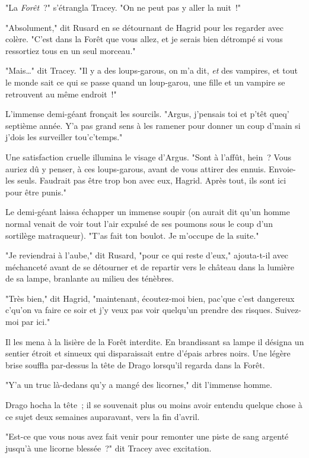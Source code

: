 "La \emph{Forêt}~?" s'étrangla Tracey. "On ne peut pas y aller la nuit~!"

"Absolument," dit Rusard en se détournant de Hagrid pour les regarder avec colère. "C'est dans la Forêt que vous allez, et je serais bien détrompé si vous ressortiez tous en un seul morceau."

"Mais…" dit Tracey. "Il y a des loups-garous, on m'a dit, \emph{et} des vampires, et tout le monde sait ce qui se passe quand un loup-garou, une fille et un vampire se retrouvent au même endroit~!"

L'immense demi-géant fronçait les sourcils. "Argus, j'pensais toi et p'têt queq' septième année. Y'a pas grand sens à les ramener pour donner un coup d'main si j'dois les surveiller tou'c'temps."

Une satisfaction cruelle illumina le visage d'Argus. "Sont à l'affût, hein~? Vous auriez dû y penser, à ces loups-garous, avant de vous attirer des ennuis. Envoie-les seuls. Faudrait pas être trop bon avec eux, Hagrid. Après tout, ils sont ici pour être punis."

Le demi-géant laissa échapper un immense soupir (on aurait dit qu'un homme normal venait de voir tout l'air expulsé de ses poumons sous le coup d'un sortilège matraqueur). "T'as fait ton boulot. Je m'occupe de la suite."

"Je reviendrai à l'aube," dit Rusard, "pour ce qui reste d'eux," ajouta-t-il avec méchanceté avant de se détourner et de repartir vers le château dans la lumière de sa lampe, branlante au milieu des ténèbres.

"Très bien," dit Hagrid, "maintenant, écoutez-moi bien, pac'que c'est dangereux c'qu'on va faire ce soir et j'y veux pas voir quelqu'un prendre des risques. Suivez-moi par ici."

Il les mena à la lisière de la Forêt interdite. En brandissant sa lampe il désigna un sentier étroit et sinueux qui disparaissait entre d'épais arbres noirs. Une légère brise souffla par-dessus la tête de Drago lorsqu'il regarda dans la Forêt.

"Y'a un truc là-dedans qu'y a mangé des licornes," dit l'immense homme.

Drago hocha la tête~; il se souvenait plus ou moins avoir entendu quelque chose à ce sujet deux semaines auparavant, vers la fin d'avril.

"Est-ce que vous nous avez fait venir pour remonter une piste de sang argenté jusqu'à une licorne blessée~?" dit Tracey avec excitation.

